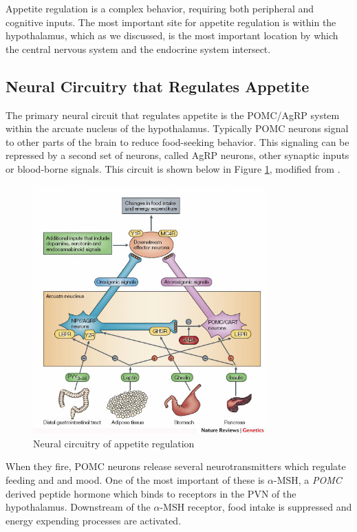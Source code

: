 \documentclass{tufte-handout}
\begin{document}
Appetite regulation is a complex behavior, requiring both peripheral and cognitive inputs.  The most important site for appetite regulation is within the hypothalamus, which as we discussed, is the most important location by which the central nervous system and the endocrine system intersect.  

\subsection{Neural Circuitry that Regulates Appetite}

The primary neural circuit that regulates appetite is the POMC/AgRP system within the arcuate nucleus of the hypothalamus.  Typically POMC neurons signal to other parts of the brain to reduce food-seeking behavior.  This signaling can be repressed by a second set of neurons, called AgRP neurons, other synaptic inputs or blood-borne signals.  This circuit is shown below in Figure \ref{fig:agrp-pomc}, modified from \cite{Bell2005}.

\begin{figure}
\centering
  \includegraphics[width=0.8\textwidth]{figures/agrp-pomc}
  \caption{Neural circuitry of appetite regulation}
    \label{fig:agrp-pomc}
\end{figure}

When they fire, POMC neurons release several neurotransmitters which regulate feeding and and mood.  One of the most important of these is $\alpha$-MSH, a \textit{POMC} derived peptide hormone which binds to receptors in the PVN of the hypothalamus.  Downstream of the $\alpha$-MSH receptor, food intake is suppressed and energy expending processes are activated.
\end{document}
